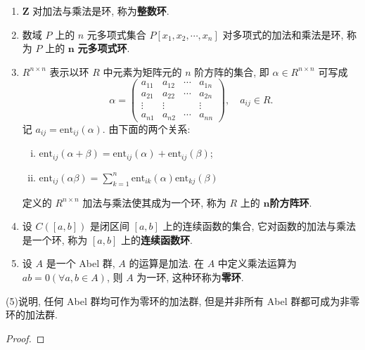 \documentclass[../../main.tex]{subfiles}
\begin{document}
\begin{example}
\begin{enumerate}[(1)]
\item \( \mathbf{Z} \) 对加法与乘法是环, 称为\textbf{整数环}.

\item 数域 \( P \) 上的 \( n \) 元多项式集合 \( P[x_1,x_2,\cdots,x_n] \) 对多项式的加法和乘法是环, 称为 \( P \) 上的 \( \boldsymbol{n} \) \textbf{元多项式环}. 

\item \( R^{n \times n} \) 表示以环 \( R \) 中元素为矩阵元的 \( n \) 阶方阵的集合, 即 \( \alpha \in R^{n \times n} \) 可写成
\[
\alpha = \begin{pmatrix}
a_{11} & a_{12} & \cdots & a_{1n} \\
a_{21} & a_{22} & \cdots & a_{2n} \\
\vdots & \vdots & & \vdots \\
a_{n1} & a_{n2} & \cdots & a_{nn}
\end{pmatrix}, \quad a_{ij} \in R.
\]
记 \( a_{ij} = \text{ent}_{ij}(\alpha) \). 由下面的两个关系:
\begin{enumerate}[(i)]
\item \( \text{ent}_{ij}(\alpha + \beta) = \text{ent}_{ij}(\alpha) + \text{ent}_{ij}(\beta) \);
\item \( \text{ent}_{ij}(\alpha\beta) = \sum_{k=1}^n \text{ent}_{ik}(\alpha)\text{ent}_{kj}(\beta) \)
\end{enumerate}
定义的 \( R^{n \times n} \) 加法与乘法使其成为一个环, 称为 \( R \) 上的 \(\boldsymbol{n}\)\textbf{阶方阵环}.

\item 设 \( C([a,b]) \) 是闭区间 \([a,b]\) 上的连续函数的集合, 它对函数的加法与乘法是一个环, 称为 \([a,b]\) 上的\textbf{连续函数环}.

\item 设 \( A \) 是一个 Abel 群, \( A \) 的运算是加法. 在 \( A \) 中定义乘法运算为 \( ab = 0 (\forall a,b \in A) \), 则 \( A \) 为一环, 这种环称为\textbf{零环}.
\end{enumerate}
\end{example}
\begin{remark}
(5)说明, 任何 Abel 群均可作为零环的加法群, 但是并非所有 Abel 群都可成为非零环的加法群.
\end{remark}
\begin{proof}


\end{proof}
\end{document}
